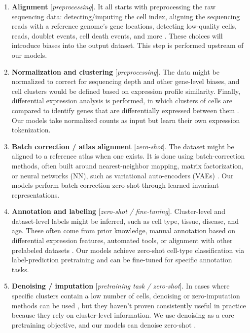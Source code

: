 \begin{enumerate}
 \item \textbf{Alignment} [\textit{preprocessing}]. It all starts with preprocessing the raw sequencing data: detecting/imputing the cell index, aligning the sequencing reads with a reference genome's gene locations, detecting low-quality cells, reads, doublet events, cell death events, and more \cite{dobinSTARUltrafastUniversal2013}. These choices will introduce biases into the output dataset. This step is performed upstream of our models.

 \item \textbf{Normalization and clustering} [\textit{preprocessing}]. The data might be normalized to correct for sequencing depth and other gene-level biases, and cell clusters would be defined based on expression profile similarity. Finally, differential expression analysis is performed, in which clusters of cells are compared to identify genes that are differentially expressed between them \cite{haghverdiBatchEffectsSinglecell2018}. Our models take normalized counts as input but learn their own expression tokenization.

 \item \textbf{Batch correction / atlas alignment} [\textit{zero-shot}]. The dataset might be aligned to a reference atlas when one exists. It is done using batch-correction methods, often built around nearest-neighbor mapping, matrix factorization, or neural networks (\gls{NN}), such as variational auto-encoders (\gls{VAE}s) \cite{scvi}. Our models perform batch correction zero-shot through learned invariant representations.

 \item \textbf{Annotation and labeling} [\textit{zero-shot / fine-tuning}]. Cluster-level and dataset-level labels might be inferred, such as cell type, tissue, disease, and age. These often come from prior knowledge, manual annotation based on differential expression features, automated tools, or alignment with other prelabeled datasets \cite{hwangSinglecellRNASequencing2018}. Our models achieve zero-shot cell-type classification via label-prediction pretraining and can be fine-tuned for specific annotation tasks.

 \item \textbf{Denoising / imputation} [\textit{pretraining task / zero-shot}]. In cases where specific clusters contain a low number of cells, denoising or zero-imputation methods can be used \cite{eraslanSinglecellRNAseqDenoising2019}, but they haven't proven consistently useful in practice because they rely on cluster-level information. We use denoising as a core pretraining objective, and our models can denoise zero-shot \cite{dijkRecoveringGeneInteractions2018}.


\end{enumerate}
